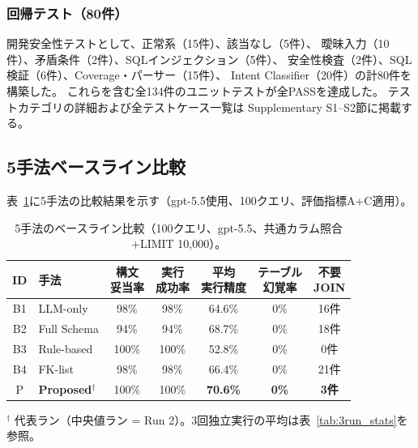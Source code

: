 \documentclass[5p,twocolumn]{elsarticle}
\begin{document}
\subsubsection{回帰テスト（80件）}

開発安全性テストとして、正常系（15件）、該当なし（5件）、
曖昧入力（10件）、矛盾条件（2件）、SQLインジェクション（5件）、
安全性検査（2件）、SQL検証（6件）、Coverage・パーサー（15件）、
Intent Classifier（20件）の計80件を構築した。
これらを含む全134件のユニットテストが全PASSを達成した。
テストカテゴリの詳細および全テストケース一覧は
Supplementary S1--S2節に掲載する。

\subsection{5手法ベースライン比較}
\label{sec:baseline_comparison}

表~\ref{tab:baseline_results}に5手法の比較結果を示す（gpt-5.5使用、100クエリ、評価指標A+C適用）。

\begin{table}[htbp]
  \centering
  \caption{5手法のベースライン比較（100クエリ、gpt-5.5、共通カラム照合+LIMIT 10{,}000）。}
  \label{tab:baseline_results}
  \small
  \begin{tabular}{clccccc}
    \toprule
    ID & 手法 & \shortstack{構文\\妥当率} & \shortstack{実行\\成功率} & \shortstack{平均\\実行精度} & \shortstack{テーブル\\幻覚率} & \shortstack{不要\\ JOIN} \\
    \midrule
    B1 & LLM-only & 98\% & 98\% & 64.6\% & 0\% & 16件 \\
    B2 & Full Schema & 94\% & 94\% & 68.7\% & 0\% & 18件 \\
    B3 & Rule-based & 100\% & 100\% & 52.8\% & 0\% & 0件 \\
    B4 & FK-list & 98\% & 98\% & 66.4\% & 0\% & 21件 \\
    P & \textbf{Proposed}$^\dagger$ & 100\% & 100\% & \textbf{70.6\%} & \textbf{0\%} & \textbf{3件} \\
    \bottomrule
  \end{tabular}
  \begin{flushleft}
  \footnotesize $^\dagger$ 代表ラン（中央値ラン = Run 2）。3回独立実行の平均は表~\ref{tab:3run_stats}を参照。
  \end{flushleft}
\end{table}
\end{document}
